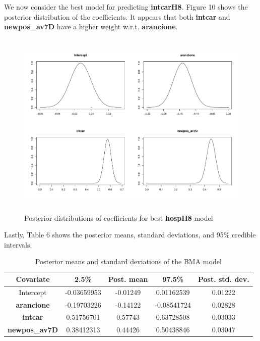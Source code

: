 \documentclass[12pt,a4paper]{article}
\theoremstyle{definition}
\theoremstyle{remark}
\begin{document}
We now consider the best model for predicting \textbf{intcarH8}. Figure 10 shows the posterior distribution of the coefficients. It appears that both \textbf{intcar} and \textbf{newpos\_av7D} have a higher weight w.r.t. \textbf{arancione}. 

\begin{figure}[htb!]
	\centering
	\includegraphics[width=140mm, height=90mm,scale=0.5]{posterior_2.pdf}
	\caption{Posterior distributions of coefficients for best \textbf{hospH8} model}
\end{figure}



Lastly, Table 6 shows the posterior means, standard deviations, and 95\% credible intervals.

\begin{table}[htb!]
	\centering
	\begin{tabular}{|c|c|c|c|c|}
		\hline
		Covariate         & 2.5\%  & Post. mean & 97.5\% & Post. std. dev.\\ \hline
		Intercept          & -0.03659953&-0.01249     & 0.01162539 & 0.01222                  \\ \hline
		\textbf{arancione}& -0.19703226&-0.14122  &-0.08541724   &  0.02828                       \\ \hline
		\textbf{intcar}    & 0.51756701& 0.57743   &0.63728508    &   0.03033               \\ \hline	\textbf{newpos\_av7D}     & 0.38412313 &  0.44426&0.50438846     &  0.03047              \\ \hline
	\end{tabular}
	\caption{Posterior means and standard deviations of the BMA model}
\end{table}
\end{document}
